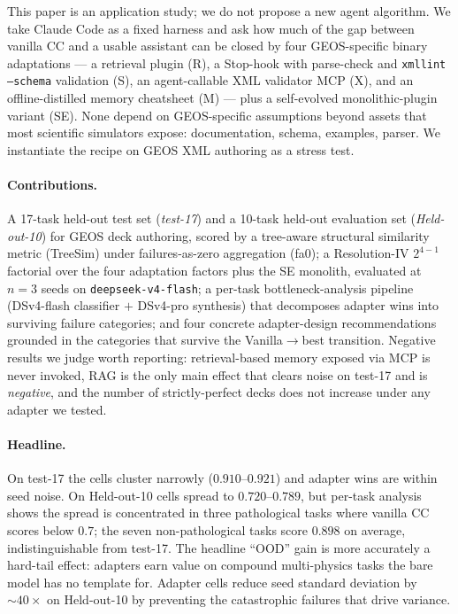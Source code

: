 \documentclass{article}
\begin{document}
This paper is an application study; we do not propose a new agent algorithm. We take Claude Code as a fixed harness and ask how much of the gap between vanilla CC and a usable assistant can be closed by four GEOS-specific binary adaptations --- a retrieval plugin (R), a Stop-hook with parse-check and \texttt{xmllint --schema} validation (S), an agent-callable XML validator MCP (X), and an offline-distilled memory cheatsheet (M) --- plus a self-evolved monolithic-plugin variant (SE). None depend on GEOS-specific assumptions beyond assets that most scientific simulators expose: documentation, schema, examples, parser. We instantiate the recipe on GEOS XML authoring as a stress test.

\paragraph{Contributions.}
A 17-task held-out test set (\emph{test-17}) and a 10-task held-out evaluation set (\emph{Held-out-10}) for GEOS deck authoring, scored by a tree-aware structural similarity metric (TreeSim) under failures-as-zero aggregation (fa0); a Resolution-IV $2^{4-1}$ factorial over the four adaptation factors plus the SE monolith, evaluated at $n=3$ seeds on \texttt{deepseek-v4-flash}; a per-task bottleneck-analysis pipeline (DSv4-flash classifier $+$ DSv4-pro synthesis) that decomposes adapter wins into surviving failure categories; and four concrete adapter-design recommendations grounded in the categories that survive the Vanilla$\to$best transition. Negative results we judge worth reporting: retrieval-based memory exposed via MCP is never invoked, RAG is the only main effect that clears noise on test-17 and is \emph{negative}, and the number of strictly-perfect decks does not increase under any adapter we tested.

\paragraph{Headline.}
On test-17 the cells cluster narrowly ($0.910$--$0.921$) and adapter wins are within seed noise. On Held-out-10 cells spread to $0.720$--$0.789$, but per-task analysis shows the spread is concentrated in three pathological tasks where vanilla CC scores below $0.7$; the seven non-pathological tasks score $0.898$ on average, indistinguishable from test-17. The headline ``OOD'' gain is more accurately a hard-tail effect: adapters earn value on compound multi-physics tasks the bare model has no template for. Adapter cells reduce seed standard deviation by ${\sim}40{\times}$ on Held-out-10 by preventing the catastrophic failures that drive variance.
\end{document}

